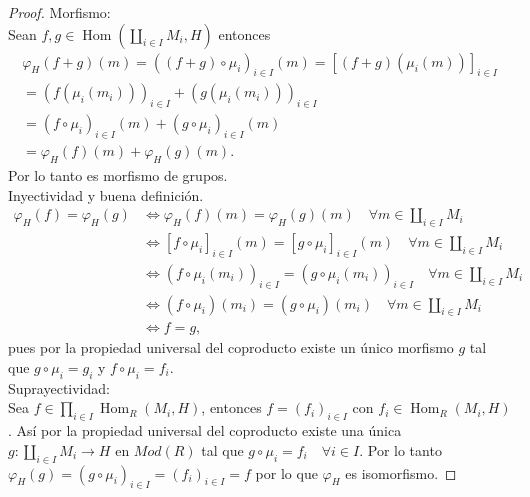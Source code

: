 \documentclass{article}
\begin{document}
\begin{enumerate}[label=\textbf{Ej \arabic*.}]
\begin{proof}
Morfismo: \\Sean $f,g\in  \operatorname{Hom}\left(\displaystyle\coprod_{i\in I}M_i,H\right)$ entonces
\begin{gather*}
\varphi_H(f+g)(m)=((f+g)\circ \mu_i)_{i\in I}(m)= [(f+g)(\mu_i(m))]_{i\in I} \\
=(f(\mu_i(m_i)))_{i\in I}+(g(\mu_i(m_i)))_{i\in I}\\
=(f\circ \mu_i)_{i\in I}(m)+(g\circ \mu_i)_{i\in I}(m)\\
=\varphi_H(f)(m)+\varphi_H(g)(m).
\end{gather*}
Por lo tanto es morfismo de grupos.\\

Inyectividad y buena definición.\\

\begin{align*}
\varphi_H(f)=\varphi_H(g) &\iff \varphi_H(f)(m)=\varphi_H(g)(m)\quad \forall m\in \displaystyle\coprod_{i\in I}M_i\\
&\iff [f\circ \mu_i]_{i\in I}(m)=[g\circ \mu_i]_{i\in I}(m)\quad \forall m\in \displaystyle\coprod_{i\in I}M_i\\
&\iff (f\circ \mu_i(m_i))_{i\in I}=(g\circ \mu_i(m_i))_{i\in I}\quad \forall m\in \displaystyle\coprod_{i\in I}M_i\\
&\iff (f\circ \mu_i)(m_i)=(g\circ \mu_i)(m_i)\quad \forall m\in \displaystyle\coprod_{i\in I}M_i\\
&\iff f=g,
\end{align*}
pues por la propiedad universal del coproducto existe un único morfismo $g$ tal que $g\circ\mu_i=g_i$ y $f\circ\mu_i=f_i$.\\

Suprayectividad:\\
Sea $f\in \prod_{i\in I}\operatorname{Hom}_R\left(M_i,H\right)$, entonces $f=(f_i)_{i\in I}$ con $f_i\in \operatorname{Hom}_R\left(M_i,H\right)$. 
Así por la propiedad universal del coproducto existe una única \\$g\colon\displaystyle\coprod_{i\in I}M_i\longrightarrow H$ en $Mod(R)$
tal que $g\circ \mu_i=f_i\quad \forall i\in I$. Por lo tanto $\varphi_H(g)=(g\circ\mu_i)_{i\in I}=(f_i)_{i\in I}=f$ por lo que $\varphi_H$ es isomorfismo.
\end{proof}



\end{enumerate}
\end{document}
